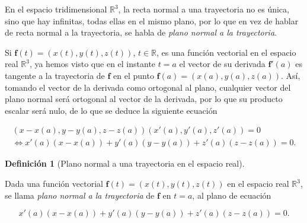 \documentclass[
  a4paper,
]{scrreport}
\theoremstyle{definition}
\newtheorem{definition}{Definición}[chapter]
\theoremstyle{plain}
\theoremstyle{plain}
\theoremstyle{definition}
\theoremstyle{definition}
\theoremstyle{plain}
\theoremstyle{remark}
\begin{document}
En el espacio tridimensional \(\mathbb{R}^3\), la recta normal a una
trayectoria no es única, sino que hay infinitas, todas ellas en el mismo
plano, por lo que en vez de hablar de recta normal a la trayectoria, se
habla de \emph{plano normal a la trayectoria}.

Si \(\mathbf{f}(t)=(x(t),y(t),z(t))\), \(t\in \mathbb{R}\), es una
función vectorial en el espacio real \(\mathbb{R}^3\), ya hemos visto
que en el instante \(t=a\) el vector de su derivada \(\mathbf{f}'(a)\)
es tangente a la trayectoria de \(\mathbf{f}\) en el punto
\(\mathbf{f}(a)=(x(a),y(a),z(a))\). Así, tomando el vector de la
derivada como ortogonal al plano, cualquier vector del plano normal será
ortogonal al vector de la derivada, por lo que su producto escalar será
nulo, de lo que se deduce la siguiente ecuación

\[
\begin{gathered}
(x-x(a),y-y(a),z-z(a))(x'(a),y'(a),z'(a)) = 0 \\
\Leftrightarrow x'(a)(x-x(a))+y'(a)(y-y(a))+z'(a)(z-z(a))=0.
\end{gathered}
\]

\begin{definition}[Plano normal a una trayectoria en el espacio
real]\protect\hypertarget{def-plano-normal-trayectoria-espacio}{}\label{def-plano-normal-trayectoria-espacio}

Dada una función vectorial \(\mathbf{f}(t)=(x(t),y(t),z(t))\) en el
espacio real \(\mathbb{R}^3\), se llama \emph{plano normal a la
trayectoria} de \(\mathbf{f}\) en \(t=a\), al plano de ecuación

\[
x'(a)(x-x(a))+y'(a)(y-y(a))+z'(a)(z-z(a))=0.
\]

\end{definition}
\end{document}
